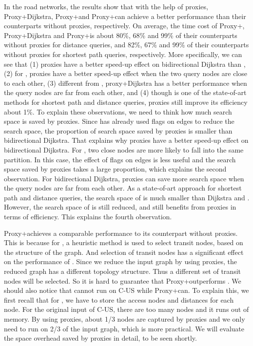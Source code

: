 In the road networks, the results show that with the help of proxies, Proxy+Dijkstra, Proxy+\arcflag  and Proxy+\ah can achieve a better performance than their counterparts without proxies, respectively. On average, the time cost of Proxy+\arcflag, Proxy+Dijkstra and Proxy+\ah is about 80\%, 68\% and 99\% of their counterparts without proxies for distance queries, and 82\%, 67\% and 99\% of their counterparts without proxies for shortest path queries, respectively. More specifically, we can see that (1) proxies have a better speed-up effect on bidirectional Dijkstra than \arcflag, (2) for \arcflag, proxies have a better speed-up effect when the two query nodes are close to each other, (3) different from \arcflag, proxy+Dijkstra has a better performance when the query nodes are far from each other, and (4) though \ah is one of the state-of-art methods for shortest path and distance queries, proxies still improve its efficiency about 1\%. To explain these observations, we need to think how much search space is saved by proxies. Since \arcflag has already used flags on edges to reduce the search space, the proportion of search space saved by proxies is smaller than bidirectional Dijkstra. That explains why proxies have a better speed-up effect on bidirectional Dijkstra. For \arcflag, two close nodes are more likely to fall into the same partition. In this case, the effect of flags on edges is less useful and the search space saved by proxies takes a large proportion, which explains the second observation. For bidirectional Dijkstra, proxies can save more search space when the query nodes are far from each other. As a state-of-art approach for shortest path and distance queries, the search space of \ah is much smaller than Dijkstra and \arcflag. However, the search space of \ah is still reduced, and \ah still benefits from proxies in terms of efficiency. This explains the fourth observation.

Proxy+\tnr achieves a comparable performance to its counterpart without proxies. This is because for \tnr, a heuristic method is used to select transit nodes, based on the structure of the graph. And selection of transit nodes has a significant effect on the performance of \tnr. Since we reduce the input graph by using proxies, the reduced graph has a different topology structure. Thus a different set of transit nodes will be selected. So it is hard to guarantee that Proxy+\tnr outperforms \tnr. We should also notice that \tnr cannot run on C-US while Proxy+\tnr can. To explain this, we first recall that for \tnr, we have to store the access nodes and distances for each node. For the original input of C-US, there are too many nodes and it runs out of memory. By using proxies, about 1/3 nodes are captured by proxies and we only need to run \tnr on 2/3 of the input graph, which is more practical.
We will evaluate the space overhead saved by proxies in detail, to be seen shortly.



